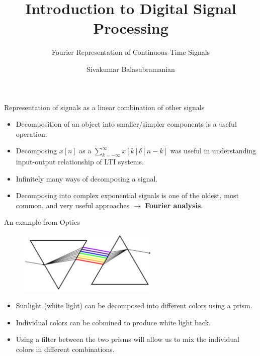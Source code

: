 \documentclass[aspectratio=169]{beamer}
\title{Introduction to Digital Signal Processing}
\subtitle{Fourier Representation of Continuous-Time Signals}
\author{Sivakumar Balasubramanian}
\institute[Christian Medical College] %
{
  \inst{}%
  Department of Bioengineering\\
  Christian Medical College, Bagayam\\
  Vellore 632002
}
\date{}
\let\olditem\item
\renewcommand{\item}{\setlength{\itemsep}{\fill}\olditem}
\begin{document}
\begin{frame}
  \titlepage
\end{frame}


\begin{frame}[t]{Representation of signals as a linear combination of other signals}
  \begin{itemize}
    \item Decomposition of an object into smaller/simpler components is a useful operation.

     \item Decomposing $x[n]$ as a $\sum_{k=-\infty}^{\infty} x[k] \delta[n - k]$ was useful in understanding input-output relationship of LTI systems.

     \item Infinitely many ways of decomposing a signal.

     \item Decomposing into complex exponential signals is one of the oldest, most common, and very useful approaches $\longrightarrow$ \textbf{Fourier analysis}.
  \end{itemize}
\end{frame}


\begin{frame}[t]{An example from Optics}
  \begin{figure}
  \includegraphics[width=0.6\textwidth]{img/decomp.png}
  \end{figure}

  \begin{itemize}
    \item Sunlight (white light) can be decomposed into different colors using a prism.

    \item Individual colors can be cobmined to produce white light back.
  
    \item Using a filter between the two prisms will allow us to mix the individual colors in different combinations.
  \end{itemize}
\end{frame}
\end{document}
